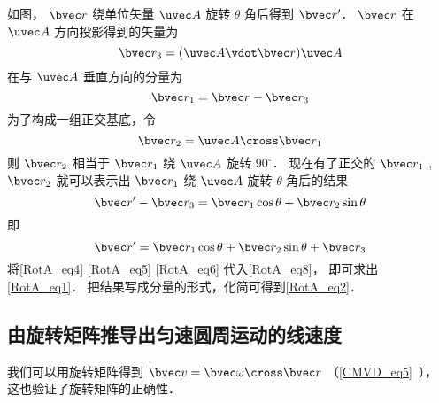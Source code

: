 如图， $\bvec r$ 绕单位矢量 $\uvec A$ 旋转 $\theta$ 角后得到 $\bvec r'$．  $\bvec r$ 在 $\uvec A$ 方向投影得到的矢量为
\begin{equation}\label{RotA_eq4}
\bvec r_3 = (\uvec A \vdot \bvec r)\uvec A
\end{equation}
在与 $\uvec A$ 垂直方向的分量为
\begin{equation}\label{RotA_eq5}
\bvec r_1 = \bvec r - \bvec r_3
\end{equation}
为了构成一组正交基底，令
\begin{equation}\label{RotA_eq6}
\bvec r_2 = \uvec A \cross \bvec r_1
\end{equation}
则 $\bvec r_2$ 相当于 $\bvec r_1$ 绕 $\uvec A$ 旋转 $90^\circ$． 现在有了正交的 $\bvec r_1$ , $\bvec r_2$  就可以表示出 $\bvec r_1$ 绕 $\uvec A$ 旋转 $\theta$ 角后的结果
\begin{equation}
\bvec r' - \bvec r_3 = \bvec r_1\cos \theta  + \bvec r_2\sin \theta
\end{equation}
即
\begin{equation}\label{RotA_eq8}
\bvec r' = \bvec r_1\cos \theta  + \bvec r_2\sin \theta  + \bvec r_3
\end{equation} 
将\autoref{RotA_eq4} \autoref{RotA_eq5} \autoref{RotA_eq6} 代入\autoref{RotA_eq8}， 即可求出\autoref{RotA_eq1}． 把结果写成分量的形式，化简可得到\autoref{RotA_eq2}．

\subsection{由旋转矩阵推导出匀速圆周运动的线速度} 

我们可以用旋转矩阵得到 $\bvec v = \bvec \omega  \cross \bvec r$ （\autoref{CMVD_eq5}~）， 这也验证了旋转矩阵的正确性．

